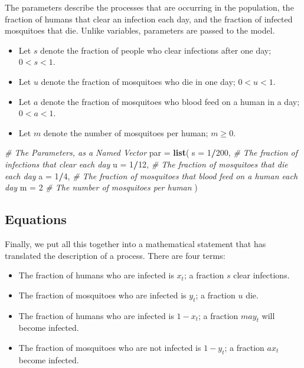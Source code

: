 \documentclass[
]{book}
\newenvironment{Shaded}{\begin{snugshade}}{\end{snugshade}}
\newcommand{\AttributeTok}[1]{\textcolor[rgb]{0.13,0.29,0.53}{#1}}
\newcommand{\CommentTok}[1]{\textcolor[rgb]{0.56,0.35,0.01}{\textit{#1}}}
\newcommand{\DecValTok}[1]{\textcolor[rgb]{0.00,0.00,0.81}{#1}}
\newcommand{\FunctionTok}[1]{\textcolor[rgb]{0.13,0.29,0.53}{\textbf{#1}}}
\newcommand{\NormalTok}[1]{#1}
\newcommand{\OtherTok}[1]{\textcolor[rgb]{0.56,0.35,0.01}{#1}}
\newcommand{\SpecialCharTok}[1]{\textcolor[rgb]{0.81,0.36,0.00}{\textbf{#1}}}
\begin{document}
The parameters describe the processes that are occurring in the population, the fraction of humans that clear an infection each day, and the fraction of infected mosquitoes that die. Unlike variables, parameters are passed to the model.

\begin{itemize}
\item
  Let \(s\) denote the fraction of people who clear infections after one day; \(0 < s < 1.\)
\item
  Let \(u\) denote the fraction of mosquitoes who die in one day; \(0 < u < 1.\)
\item
  Let \(a\) denote the fraction of mosquitoes who blood feed on a human in a day; \(0 < a < 1.\)
\item
  Let \(m\) denote the number of mosquitoes per human; \(m \geq 0.\)
\end{itemize}

\begin{Shaded}
\begin{Highlighting}[]
\CommentTok{\# The Parameters, as a Named Vector}
\NormalTok{par }\OtherTok{=} \FunctionTok{list}\NormalTok{(}
  \AttributeTok{s =} \DecValTok{1}\SpecialCharTok{/}\DecValTok{200}\NormalTok{, }\CommentTok{\# The fraction of infections that clear each day}
  \AttributeTok{u =} \DecValTok{1}\SpecialCharTok{/}\DecValTok{12}\NormalTok{,  }\CommentTok{\# The fraction of mosquitoes that die each day}
  \AttributeTok{a =} \DecValTok{1}\SpecialCharTok{/}\DecValTok{4}\NormalTok{,   }\CommentTok{\# The fraction of mosquitoes that blood feed on a human each day}
  \AttributeTok{m =} \DecValTok{2}      \CommentTok{\# The number of mosquitoes per human}
\NormalTok{) }
\end{Highlighting}
\end{Shaded}

\subsection{Equations}\label{equations}

Finally, we put all this together into a mathematical statement that has translated the description of a process. There are four terms:

\begin{itemize}
\item
  The fraction of humans who are infected is \(x_t\); a fraction \(s\) clear infections.
\item
  The fraction of mosquitoes who are infected is \(y_t\); a fraction \(u\) die.
\item
  The fraction of humans who are infected is \(1-x_t\); a fraction \(m a y_t\) will become infected.
\item
  The fraction of mosquitoes who are not infected is \(1-y_t\); a fraction \(a x_t\) become infected.
\end{itemize}
\end{document}
